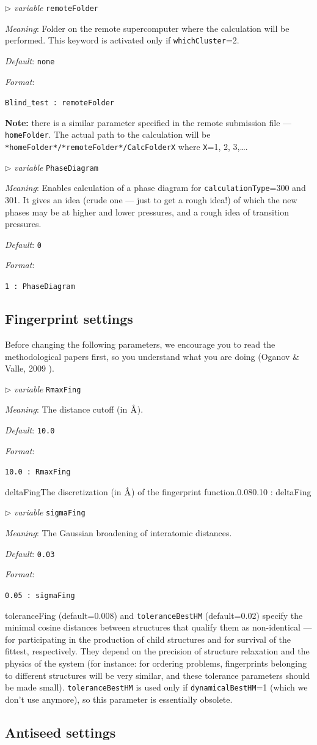 \documentclass[12pt]{article}
\newcommand{\keyword}[1]{\texttt{#1}}
\newcommand{\file}[1]{\texttt{#1}}
\newcommand{\paramacro}[6]{
\vspace{0.5cm}
$\triangleright$ \emph{variable} {\color{blue} \texttt{#1}}

\emph{Meaning}: {#2}

{#3}

\emph{Default}: \texttt{#4}

\emph{Format}:

{\addtolength{\leftskip}{10mm} 
\texttt{#5}
\par}


{\small #6}

}
\begin{document}
\paramacro{remoteFolder}{Folder on the remote supercomputer where the
calculation will be performed. This keyword is activated only if
\keyword{whichCluster}=2.}{}{\rm none}{Blind\_test  : remoteFolder}{
\textbf{Note:} there is a similar parameter specified in the remote submission
file --- \keyword{homeFolder}. The actual path to the calculation will be
\file{*homeFolder*/*remoteFolder*/CalcFolderX} where \texttt{X}=1, 2, 3,\ldots.}


\paramacro{PhaseDiagram}{Enables calculation of a phase diagram for
\keyword{calculationType}=300 and 301. It gives an idea (crude one --- just to
get a rough idea!) of which the new phases may be at higher and lower pressures,
and a rough idea of transition pressures.}{} {0}{1 : PhaseDiagram}{}


\subsection{Fingerprint settings} \label{input_fingerprints}

Before changing the following parameters, we encourage you to read the
methodological papers first, so you understand what you are doing (Oganov \&
Valle, 2009 \cite{Oganov2009}).

\paramacro{RmaxFing}{The distance cutoff (in $\text{\r{A}}$).}{}{10.0}{10.0  :
RmaxFing}

\paramacro{deltaFing}{The discretization (in $\text{\r{A}}$) of the fingerprint
function.}{}{0.08}{0.10  : deltaFing}

\paramacro{sigmaFing}{The Gaussian broadening of interatomic distances.}{}{0.03}
{0.05  : sigmaFing}

\keyword{toleranceFing} (default=0.008) and \keyword{toleranceBestHM}
(default=0.02) specify the minimal cosine distances between structures that
qualify them as non-identical --- for participating in the production of child
structures and for survival of the fittest, respectively. They depend on the
precision of structure relaxation and the physics of the system (for instance:
for ordering problems, fingerprints belonging to different structures will be
very similar, and these tolerance parameters should be made small).
\keyword{toleranceBestHM} is used only if \keyword{dynamicalBestHM}=1 (which we
don't use anymore), so this parameter is essentially obsolete.


\subsection{Antiseed settings}
\end{document}
